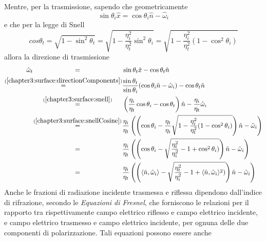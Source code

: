 Mentre, per la trasmissione, sapendo che geometricamente 
\begin{equation}\label{chapter3:surface:directionComponents}
	\sin\theta_i\hat{x} = \cos\theta_i\hat{n} - \hat{\omega}_i
\end{equation}
e che per la legge di Snell
\begin{equation}\label{chapter3:surface:snellCosine}
	cos\theta_t = \sqrt{1-\sin^2\theta_t} = \sqrt{1-\frac{\eta_i^2}{\eta_t^2}\sin^2\theta_i} = \sqrt{1-\frac{\eta_i^2}{\eta_t^2}(1-\cos^2\theta_i)}
\end{equation}
allora la direzione di trasmissione
{
	\newcommand{\dotprr}{\langle\hat{n},\hat{\omega}_i\rangle}
	\newcommand{\eq}{\mathmakebox[\widthof{(\ref{chapter3:surface:snellCosine})}]{=}}
	\begin{align}
		\hat{\omega}_t \eq& \sin\theta_t\hat{x} - \cos\theta_t\hat{n} \\ 
			\stackrel{(\ref{chapter3:surface:directionComponents})}{\eq}&%
				\frac{\sin\theta_t}{\sin\theta_i}(\cos\theta_i\hat{n}-\hat{\omega}_i)-\cos\theta_t\hat{n} \nonumber \\
			\stackrel{(\ref{chapter3:surface:snell})}{\eq}&%
				\left(\frac{\eta_i}{\eta_t}\cos\theta_i -\cos\theta_t\right)\hat{n}-\frac{\eta_i}{\eta_t}\hat{\omega}_i \nonumber \\
			\stackrel{(\ref{chapter3:surface:snellCosine})}{\eq}& \frac{\eta_i}{\eta_t}\left(\left(\cos\theta_i%
				-\frac{\eta_t}{\eta_i}\sqrt{1-\frac{\eta_i^2}{\eta_t^2}(1-\cos^2\theta_i)}\right)\hat{n}-\hat{\omega}_i\right)\nonumber \\
			\eq& \frac{\eta_i}{\eta_t}\left(\left(\cos\theta_i-\sqrt{\frac{\eta_t^2}{\eta_i^2}-1+\cos^2\theta_i)}\right)\hat{n}-\hat{\omega}_i\right)%
				\nonumber \\
			\eq& \frac{\eta_i}{\eta_t}\left(\left(\dotprr -\sqrt{\frac{\eta_t^2}{\eta_i^2}-1+\dotprr^2)}\right)\hat{n}-\hat{\omega}_i\right)
	\end{align}
}
Anche le frazioni di radiazione incidente trasmessa e riflessa dipendono dall'indice di rifrazione, secondo le \textit{Equazioni di Fresnel}, che 
forniscono le relazioni per il rapporto tra rispettivamente campo elettrico riflesso e campo elettrico incidente, e campo elettrico trasmesso 
e campo elettrico incidente, per ognuna delle due componenti di polarizzazione\footnotemark{}. Tali equazioni possono essere anche 
